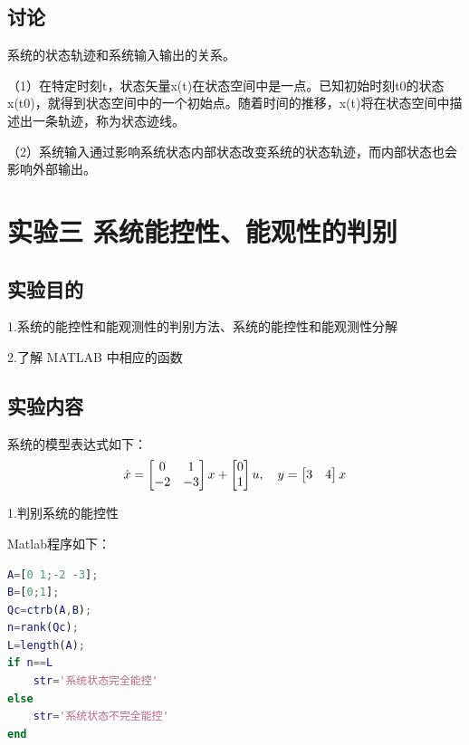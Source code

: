 \documentclass[UTF8]{ctexart}
\begin{document}
\subsection{ 讨论}
\par  系统的状态轨迹和系统输入输出的关系。
\par  （1）在特定时刻t，状态矢量x(t)在状态空间中是一点。已知初始时刻t0的状态x(t0)，就得到状态空间中的一个初始点。随着时间的推移，x(t)将在状态空间中描述出一条轨迹，称为状态迹线。
\par  （2）系统输入通过影响系统状态内部状态改变系统的状态轨迹，而内部状态也会影响外部输出。
		
		
\newpage
\section{实验三 \quad 系统能控性、能观性的判别}
\subsection{ 实验目的 }
\par 1.系统的能控性和能观测性的判别方法、系统的能控性和能观测性分解 
\par 2.了解 MATLAB 中相应的函数
\subsection{实验内容 }
\par 系统的模型表达式如下：		
\begin{equation}
    \dot x\\=\begin{bmatrix}
    0 & 1 \\
    -2 & -3 \\ \end{bmatrix}x+ \begin{bmatrix}
    0\\
    1\\
    \end{bmatrix}u ,  \quad      y=\begin{bmatrix}
    3 & 4 \\\end{bmatrix}x
\end{equation}
			
\par 1.判别系统的能控性		
\par Matlab程序如下：
\par  \begin{lstlisting}[language=matlab,escapeinside=``]		
A=[0 1;-2 -3];
B=[0;1];
Qc=ctrb(A,B);
n=rank(Qc);
L=length(A);
if n==L
    str='系统状态完全能控'
else 
    str='系统状态不完全能控'
end		
\end{lstlisting}		
		
\end{document}
